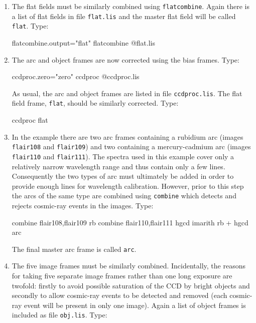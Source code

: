 \documentclass[chapters,twoside,11pt]{starlink}
\begin{document}
\begin{enumerate}
  \item The flat fields must be similarly combined using \texttt{flatcombine}.  Again there is a list of flat fields in file \texttt{flat.lis} and the master flat field will be called \texttt{flat}.
   Type:

\begin{terminalv}
flatcombine.output="flat"
flatcombine  @flat.lis
\end{terminalv}

  \item The arc and object frames are now corrected using the bias
   frames.  Type:

\begin{terminalv}
ccdproc.zero="zero"
ccdproc  @ccdproc.lis
\end{terminalv}

   As usual, the arc and object frames are listed in file \texttt{ccdproc.lis}.  The flat field frame, \texttt{flat}, should be similarly
   corrected.  Type:

\begin{terminalv}
ccdproc  flat
\end{terminalv}

  \item In the example there are two arc frames containing a
   rubidium arc (images \texttt{flair108} and \texttt{flair109})
   and two containing a mercury-cadmium arc (images
   \texttt{flair110} and \texttt{flair111}).  The spectra used in this example
   cover only a relatively narrow wavelength range and thus contain
   only a few lines.  Consequently the two types of arc must
   ultimately be added in order to provide enough lines for
   wavelength calibration.  However, prior to this step the
   arcs of the same type are combined using \texttt{combine}
   which detects and rejects cosmic-ray events in the images.
   Type:

\begin{terminalv}
combine  flair108,flair109  rb
combine  flair110,flair111  hgcd
imarith  rb + hgcd  arc
\end{terminalv}

   The final master arc frame is called \texttt{arc}.

  \item The five image frames must be similarly combined.  Incidentally, the
   reasons for taking five separate image frames rather than one long
   exposure are twofold: firstly to avoid possible saturation of the CCD by
   bright objects and secondly to allow cosmic-ray events to be detected and
   removed (each cosmic-ray event will be present in only one image).  Again
   a list of object frames is included as file \texttt{obj.lis}.  Type:


\end{enumerate}
\end{document}
